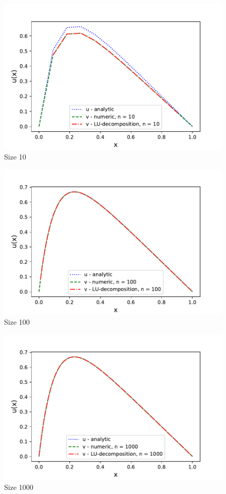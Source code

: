\documentclass{article}
\begin{document}
\begin{figure}[h]
    \centering
    \includegraphics[width =12cm]{python/size_10.pdf}
    \caption{Size 10}
    \label{fig:1}
\end{figure}

\begin{figure}[h]
    \centering
    \includegraphics[width =12cm]{python/size_100.pdf}
    \caption{Size 100}
    \label{fig:2}
\end{figure}


\begin{figure}[h]
    \centering
    \includegraphics[width =12cm]{python/size_1000.pdf}
    \caption{Size 1000}
    \label{fig:3}
\end{figure}
\end{document}
